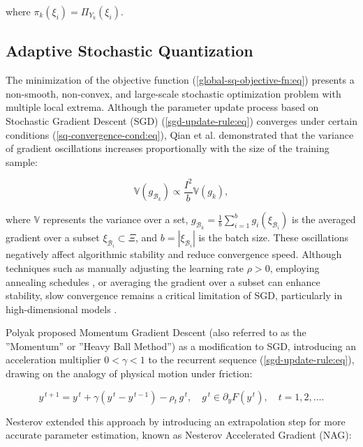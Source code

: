 \noindent where $\pi_k(\xi_i)=\Pi_{Y_k}(\xi_i)$.

\subsection{Adaptive Stochastic Quantization} \label{adap-stoch-quant:sec}

The minimization of the objective function (\ref{global-sq-objective-fn:eq}) presents a non-smooth, non-convex, and large-scale stochastic optimization problem with multiple local extrema. Although the parameter update process based on Stochastic Gradient Descent (SGD) (\ref{sgd-update-rule:eq}) converges under certain conditions (\ref{sq-convergence-cond:eq}), Qian et al. \cite{qian2020} demonstrated that the variance of gradient oscillations increases proportionally with the size of the training sample:

\begin{equation}
    \label{sgd-oscillations:eq}
    \mathbb{V} (g_{\mathcal{B}_k}) \propto \frac{I^2}{b} \mathbb{V} (g_k),
\end{equation}

\noindent where $\mathbb{V}$ represents the variance over a set, $g_{\mathcal{B}_k} = \frac{1}{b} \sum_{i=1}^{b} g_i (\xi_{\mathcal{B}_i})$ is the averaged gradient over a subset $\xi_{\mathcal{B}_i} \subset \Xi$, and $b = | \xi_{\mathcal{B}_i} |$ is the batch size. These oscillations negatively affect algorithmic stability and reduce convergence speed. Although techniques such as manually adjusting the learning rate $\rho > 0$, employing annealing schedules \cite{Robbins_Monro_1951}, or averaging the gradient over a subset can enhance stability, slow convergence remains a critical limitation of SGD, particularly in high-dimensional models \cite{Norkin_Kozyriev_Norkin_2024}.

Polyak \cite{Poliak_1987} proposed Momentum Gradient Descent (also referred to as the ''Momentum'' or ''Heavy Ball Method'') as a modification to SGD, introducing an acceleration multiplier $0 < \gamma < 1$ to the recurrent sequence (\ref{sgd-update-rule:eq}), drawing on the analogy of physical motion under friction:

\begin{equation}
    \label{momentum-update-rule:eq}
    y^{\,t+1} = y^{\,t} + \gamma (y^{\,t} - y^{\,t-1}) - \rho_t \,g^{\,t}, \quad g^{\,t}\in \partial_y F(y^{\,t}),   \quad t = 1,2,\ldots.
\end{equation}

Nesterov \cite{nesterov1983method,walkington_2023} extended this approach by introducing an extrapolation step for more accurate parameter estimation, known as Nesterov Accelerated Gradient (NAG):


